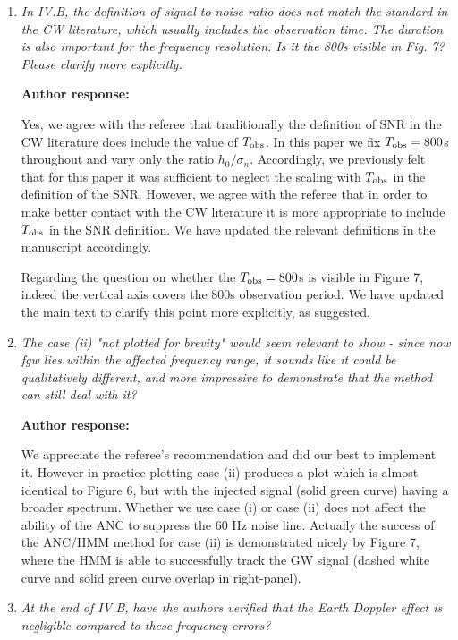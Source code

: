 \documentclass[10pt]{article}
\begin{document}
\begin{enumerate}
	\item \textit{In IV.B, the definition of signal-to-noise ratio does not match the standard  
		in the CW literature, which usually includes the observation time. The duration  
		is also important for the frequency resolution. Is it the 800s visible in Fig.  
		7? Please clarify more explicitly. }
	
			\textbf{Author response:} 
	
	Yes, we agree with the referee that traditionally the definition of SNR in the CW literature does include the value of $T_{\rm obs}$. In this paper we fix $T_{\rm obs} = 800 $s throughout and vary only the ratio $h_0/\sigma_{n}$. Accordingly, we previously felt that for this paper it was sufficient to neglect the scaling with $T_{\rm obs}$ in the definition of the SNR. However, we agree with the referee that in order to make better contact with the CW literature it is more appropriate to include $T_{\rm obs}$ in the SNR definition. We have updated the relevant definitions in the manuscript accordingly.
	
	Regarding the question on whether the $T_{\rm obs}=800$s is visible in Figure 7,  indeed the vertical axis covers the 800s observation period. We have updated the main text to clarify this point more explicitly, as suggested. 
	
	\item \textit{The case (ii) "not plotted for brevity" would seem relevant to show - since  
		now fgw lies within the affected frequency range, it sounds like it could be  
		qualitatively different, and more impressive to demonstrate that the method can  
		still deal with it?  }
	
			\textbf{Author response:} 
	
We appreciate the referee's recommendation and did our best to implement it. However in practice plotting case (ii) produces a plot which is almost identical to Figure 6, but with the injected signal (solid green curve) having a broader spectrum. Whether we use case (i) or case (ii) does not affect the ability of the ANC to suppress the 60 Hz noise line. Actually the success of the ANC/HMM method for case (ii) is demonstrated nicely by Figure 7, where the HMM is able to successfully track the GW signal (dashed white curve and solid green curve overlap in right-panel). 
	
	\item \textit{At the end of IV.B, have the authors verified that the Earth Doppler effect is negligible compared to these frequency errors?  }


\end{enumerate}
\end{document}
